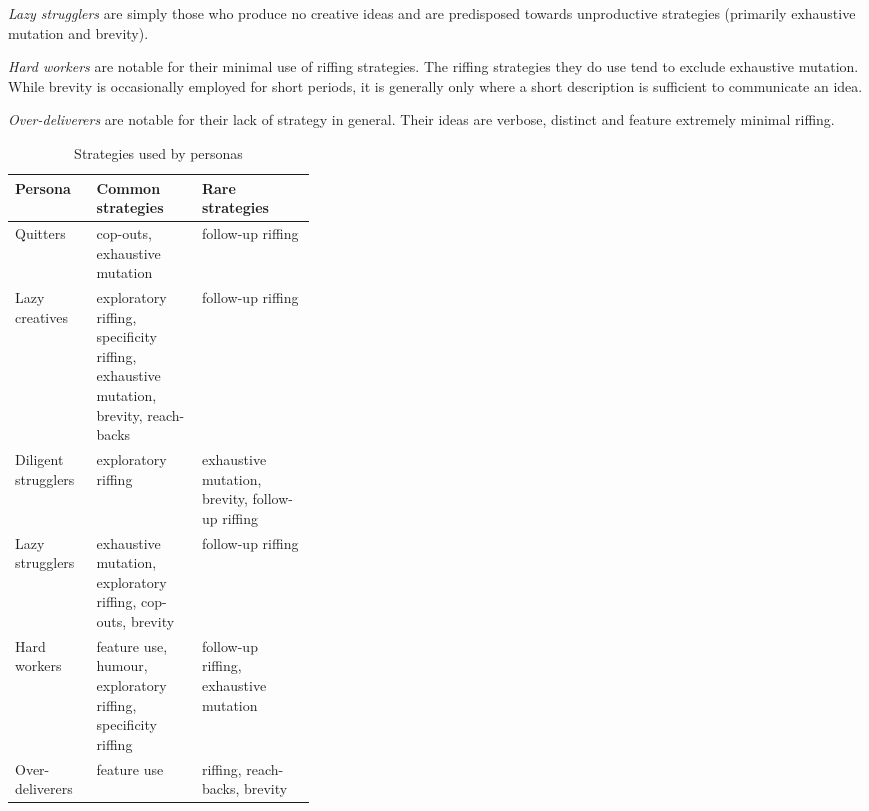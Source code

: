\emph{Lazy strugglers} are simply those who produce no creative ideas and are predisposed towards unproductive strategies (primarily exhaustive mutation and brevity).

\emph{Hard workers} are notable for their minimal use of riffing strategies. The riffing strategies they do use tend to exclude exhaustive mutation. While brevity is occasionally employed for short periods, it is generally only where a short description is sufficient to communicate an idea.

\emph{Over-deliverers} are notable for their lack of strategy in general. Their ideas are verbose, distinct and feature extremely minimal riffing. 

\begin{table*}
    \begin{tabular}{|l|p{0.35\linewidth}|l|}
        \hline
        \textbf{Persona} & \textbf{Common strategies} & \textbf{Rare strategies} \\
        \hline
        Quitters & cop-outs, exhaustive mutation & follow-up riffing \\
        \hline
        Lazy creatives & exploratory riffing, specificity riffing, \newline
        exhaustive mutation, brevity, reach-backs  & follow-up riffing  \\
        \hline
        Diligent strugglers & exploratory riffing & exhaustive mutation, brevity, \newline
        follow-up riffing \\
        \hline
        Lazy strugglers & exhaustive mutation, exploratory riffing, \newline
        cop-outs, brevity  & follow-up riffing \\
        \hline
        Hard workers & feature use, humour, \newline
        exploratory riffing, specificity riffing  & follow-up riffing, exhaustive mutation \\
        \hline
        Over-deliverers & feature use & riffing, reach-backs, brevity \\
        \hline
    \end{tabular}
    \caption{Strategies used by personas}
\end{table*}
